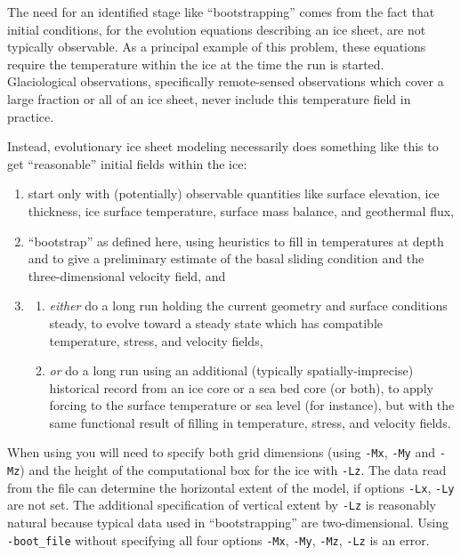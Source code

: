 The need for an identified stage like ``bootstrapping'' comes from the fact that initial conditions, for the evolution equations describing an ice sheet, are not typically observable.  As a principal example of this problem, these equations require the temperature within the ice at the time the run is started.  Glaciological observations, specifically remote-sensed observations which cover a large fraction or all of an ice sheet, never include this temperature field in practice.

Instead, evolutionary ice sheet modeling necessarily does something like this
to get ``reasonable'' initial fields within the ice:
\begin{enumerate}
\item start only with (potentially) observable quantities like surface elevation, ice thickness, ice surface temperature, surface mass balance, and geothermal flux,
\item ``bootstrap'' as defined here, using heuristics to fill in temperatures at depth and to give a preliminary estimate of the basal sliding condition and the three-dimensional velocity field, and
\item \begin{enumerate}
      \item \emph{either} do a long run holding the current geometry and surface conditions steady, to evolve toward a steady state which has compatible temperature, stress, and velocity fields,
      \item \emph{or} do a long run using an additional (typically spatially-imprecise) historical record from an ice core or a sea bed core (or both), to apply forcing to the surface temperature or sea level (for instance), but with the same functional result of filling in temperature, stress, and velocity fields.
      \end{enumerate}
\end{enumerate}

When using  you will need to specify both grid dimensions (using \texttt{-Mx}, \texttt{-My} and \texttt{-Mz}) and the height of the computational box for the ice with \texttt{-Lz}.  The data read from the file can determine the horizontal extent of the model, if options \texttt{-Lx}, \texttt{-Ly} are not set.  The additional specification of vertical extent by \texttt{-Lz} is reasonably natural because typical data used in ``bootstrapping'' are two-dimensional.  Using \texttt{-boot_file} without specifying all four options \texttt{-Mx}, \texttt{-My}, \texttt{-Mz}, \texttt{-Lz} is an error.

